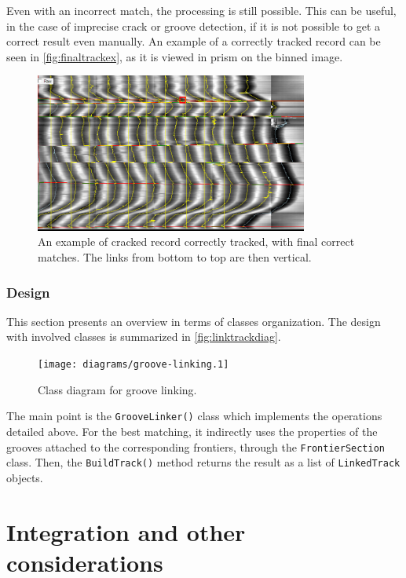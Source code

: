 Even with an incorrect match, the processing is still possible. This can be useful, in the case of imprecise crack or groove detection, if it is not possible to get a correct result even manually. An example of a correctly tracked record can be seen in \autoref{fig:finaltrackex}, as it is viewed in \gls{prism} on the binned image.

\begin{figure}[!ht]
\centering
\includegraphics[width=0.8\textwidth]{images/final-track-ex}
\caption[An example of cracked record tracked.]
{An example of cracked record correctly tracked, with final correct matches. The links from bottom to top are then vertical.}
\label{fig:finaltrackex}
\end{figure}

\subsubsection{Design}

This section presents an overview in terms of classes organization. The design with involved classes is summarized in \autoref{fig:linktrackdiag}.

\begin{figure}[!ht]
\centering
\texttt{[image: diagrams/groove-linking.1]}
\caption{Class diagram for groove linking.}
\label{fig:linktrackdiag}
\end{figure}

The main point is the \texttt{GrooveLinker()} class which implements the operations detailed above. For the best matching, it indirectly uses the properties of the grooves attached to the corresponding frontiers, through the \texttt{FrontierSection} class. Then, the \texttt{BuildTrack()} method returns the result as a list of \texttt{LinkedTrack} objects.

\section{Integration and other considerations}
\label{sec:autointegration}

